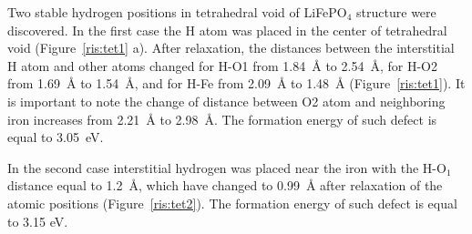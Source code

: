 Two stable hydrogen positions in tetrahedral void of LiFePO$_4$ structure were discovered.
In the first case the H atom was placed in the center of tetrahedral void (Figure~\ref{ris:tet1} a). After relaxation, the distances between the interstitial H atom and other atoms changed for H-O1 from 1.84{~\AA} to 2.54{~\AA}, for H-O2 from 1.69{~\AA} to 1.54{~\AA}, and for H-Fe from 2.09{~\AA} to 1.48{~\AA} (Figure~\ref{ris:tet1}). It is important to note the change of distance between O2 atom and neighboring iron increases from 2.21{~\AA} to 2.98{~\AA}. The formation energy of such defect is equal to 3.05~eV.

In the second case interstitial hydrogen was placed near the iron with the H-O$_1$ distance equal to 1.2{~\AA}, which have changed to 0.99{~\AA} after relaxation of the atomic positions (Figure~\ref{ris:tet2}). The formation energy of such defect is equal to 3.15 eV.	


